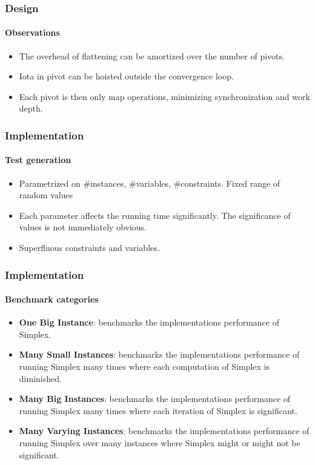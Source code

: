 \documentclass{beamer}
\begin{document}
\begin{frame}
\frametitle{Design}
\framesubtitle{Observations}
\begin{itemize}
	\item The overhead of flattening can be amortized over the number of pivots.
	
	\item Iota in pivot can be hoisted outside the convergence loop.
	
	\item Each pivot is then only map operations, minimizing synchronization and work depth.
\end{itemize}
\end{frame}


\begin{frame}
	\frametitle{Implementation}
	\framesubtitle{Test generation}
	\begin{itemize}
		\item Parametrized on \#instances, \#variables, \#constraints. Fixed range of random values
		
		\item Each parameter affects the running time significantly. The significance of values is not immediately obvious.
		
		\item Superfluous constraints and variables.
	\end{itemize}
\end{frame}

\begin{frame}
\frametitle{Implementation}
\framesubtitle{Benchmark categories}
\begin{itemize}
	\item \textbf{One Big Instance}: benchmarks the implementations performance of Simplex.
	
	\item \textbf{Many Small Instances}: benchmarks the implementations performance of running Simplex many times where each computation of Simplex is diminished.
	
	\item \textbf{Many Big Instances}: benchmarks the implementations performance of running Simplex many times where each iteration of Simplex is significant.
	
	\item \textbf{Many Varying Instances}: benchmarks the implementations performance of running Simplex over many instances where Simplex might or might not be significant.
\end{itemize}
\end{frame}
\end{document}
